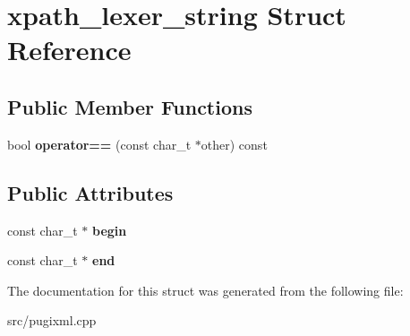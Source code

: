 \hypertarget{structxpath__lexer__string}{}\section{xpath\+\_\+lexer\+\_\+string Struct Reference}
\label{structxpath__lexer__string}
\subsection*{Public Member Functions}
\begin{DoxyCompactItemize}
\item 
\mbox{\label{structxpath__lexer__string_a6f8de9b104eef39a7d901d25363cc158}} 
bool {\bfseries operator==} (const char\+\_\+t $\ast$other) const
\end{DoxyCompactItemize}
\subsection*{Public Attributes}
\begin{DoxyCompactItemize}
\item 
\mbox{\label{structxpath__lexer__string_a0b985863d7363a75d4fdd0a7ece1fca0}} 
const char\+\_\+t $\ast$ {\bfseries begin}
\item 
\mbox{\label{structxpath__lexer__string_a13bbedeca2f8c2fb1e294325eea66878}} 
const char\+\_\+t $\ast$ {\bfseries end}
\end{DoxyCompactItemize}


The documentation for this struct was generated from the following file\+:\begin{DoxyCompactItemize}
\item 
src/pugixml.\+cpp\end{DoxyCompactItemize}

